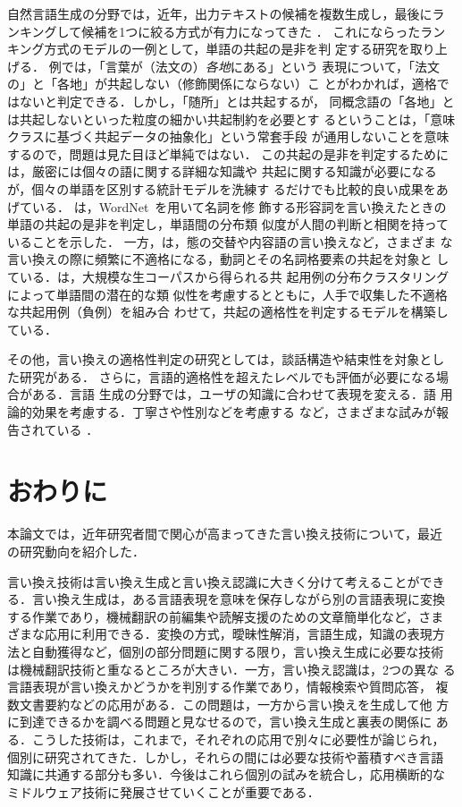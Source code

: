 自然言語生成の分野では，近年，出力テキストの候補を複数生成し，最後にラ
ンキングして候補を1つに絞る方式が有力になってきた
\cite{knight:95,langkilde:98,bangalore:00}．
これにならったランキング方式のモデルの一例として，単語の共起の是非を判
定する研究\cite{pearce:01,lapata:01:b,fujita:04:c}を取り上げる．
例では，「言葉が（法文の）\emph{各地}にある」という
表現について，「法文の」と「各地」が共起しない（修飾関係にならない）こ
とがわかれば，適格ではないと判定できる．しかし，「随所」とは共起するが，
同概念語の「各地」とは共起しないといった粒度の細かい共起制約を必要とす
るということは，「意味クラスに基づく共起データの抽象化」という常套手段
が通用しないことを意味するので，問題は見た目ほど単純ではない．
この共起の是非を判定するためには，厳密には個々の語に関する詳細な知識や
共起に関する知識が必要になるが，個々の単語を区別する統計モデルを洗練す
るだけでも比較的良い成果をあげている．
は，WordNet~\cite{WN:90}を用いて名詞を修
飾する形容詞を言い換えたときの単語の共起の是非を判定し，単語間の分布類
似度が人間の判断と相関を持っていることを示した．
一方，は，態の交替や内容語の言い換えなど，さまざま
な言い換えの際に頻繁に不適格になる，動詞とその名詞格要素の共起を対象と
している．\citeauthor{fujita:04:c}は，大規模な生コーパスから得られる共
起用例の分布クラスタリング\cite{pereira:93}によって単語間の潜在的な類
似性を考慮するとともに，人手で収集した不適格な共起用例（負例）を組み合
わせて，共起の適格性を判定するモデルを構築している．

その他，言い換えの適格性判定の研究としては，談話構造や結束性を対象とし
た研究\cite{inui:01:c,nogami:02,siddharthan:03:a}がある．
さらに，言語的適格性を超えたレベルでも評価が必要になる場合がある．言語
生成の分野では，ユーザの知識に合わせて表現を変える\cite{cawsey:92}．語
用論的効果を考慮する\cite{hovy:88}．丁寧さや性別などを考慮する
\cite{kaneko:96,uchimoto:96}など，さまざまな試みが報告されている
\cite{inui:99:b}．


\section{おわりに}
\label{sec:issues}

本論文では，近年研究者間で関心が高まってきた言い換え技術について，最近
の研究動向を紹介した．

言い換え技術は言い換え生成と言い換え認識に大きく分けて考えることができ
る．言い換え生成は，ある言語表現を意味を保存しながら別の言語表現に変換
する作業であり，機械翻訳の前編集や読解支援のための文章簡単化など，さま
ざまな応用に利用できる．変換の方式，曖昧性解消，言語生成，知識の表現方
法と自動獲得など，個別の部分問題に関する限り，言い換え生成に必要な技術
は機械翻訳技術と重なるところが大きい．一方，言い換え認識は，2つの異な
る言語表現が言い換えかどうかを判別する作業であり，情報検索や質問応答，
複数文書要約などの応用がある．この問題は，一方から言い換えを生成して他
方に到達できるかを調べる問題と見なせるので，言い換え生成と裏表の関係に
ある．こうした技術は，これまで，それぞれの応用で別々に必要性が論じられ，
個別に研究されてきた．しかし，それらの間には必要な技術や蓄積すべき言語
知識に共通する部分も多い．今後はこれら個別の試みを統合し，応用横断的な
ミドルウェア技術に発展させていくことが重要である．

